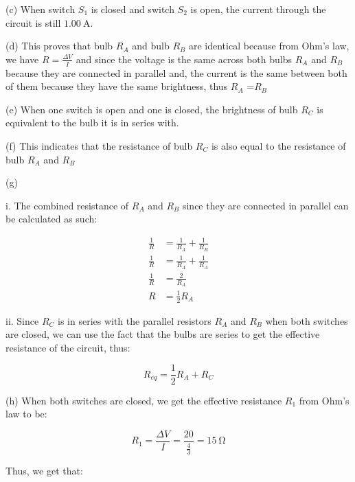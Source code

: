 \documentclass[12pt]{article}
\begin{document}
(c) When switch $S_1$ is closed and switch $S_2$ is open, the current through the circuit is still $\SI{1.00}{\ampere}$.

\bigskip

(d) This proves that bulb $R_A$ and bulb $R_B$ are identical because from Ohm's law, we have $R=\frac{\Delta V}{I}$ and since the voltage is the same across both bulbs $R_A$ and $R_B$ because they are connected in parallel and, the current is the same between both of them because they have the same brightness, thus $R_A$ =$R_B$

\bigskip

(e) When one switch is open and one is closed, the brightness of bulb $R_C$ is equivalent to the bulb it is in series with.

\bigskip

(f) This indicates that the resistance of bulb $R_C$ is also equal to the resistance of bulb $R_A$ and $R_B$

\bigskip

(g)

\bigskip

i. The combined resistance of $R_A$ and $R_B$ since they are connected in parallel can be calculated as such:

\begin{equation*}
    \begin{split}
        \frac{1}{R} & = \frac{1}{R_A} + \frac{1}{R_B} \\
        \frac{1}{R} & = \frac{1}{R_A} + \frac{1}{R_A} \\
        \frac{1}{R} & = \frac{2}{R_A} \\
        R & = \frac{1}{2}R_A
    \end{split}
\end{equation*}

\bigskip

ii. Since $R_C$ is in series with the parallel resistors $R_A$ and $R_B$ when both switches are closed, we can use the fact that the bulbs are series  to get the effective resistance of the circuit, thus:

\[R_{eq} = \frac{1}{2}R_A + R_C \]

\bigskip

(h) When both switches are closed, we get the effective resistance $R_1$ from Ohm's law to be:

\bigskip

\[R_1 = \frac{\Delta V}{I} = \frac{20}{\frac{4}{3}} = \SI{15}{\ohm}\]

Thus, we get that:
\end{document}
